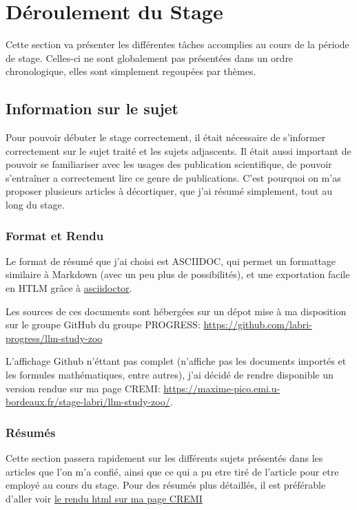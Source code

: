 \chapter{Déroulement du Stage}
\label{main}

Cette section va présenter les différentes tâches accomplies au cours de la période de stage.
Celles-ci ne sont globalement pas présentées dans un ordre chronologique, elles sont simplement regoupées par thèmes.


\section{Information sur le sujet}

Pour pouvoir débuter le stage correctement, il était nécessaire de s'informer correctement sur le sujet traité et les sujets adjascents.
Il était aussi important de pouvoir se familiariser avec les usages des publication scientifique, de pouvoir s'entraîner a correctement
lire ce genre de publications.
C'est pourquoi on m'as proposer plusieurs articles à décortiquer, que j'ai résumé simplement, tout au long du stage.

\subsection{Format et Rendu}

Le format de résumé que j'ai choisi est ASCIIDOC, qui permet un formattage similaire à Markdown (avec un peu plus de possibilités), et une exportation facile en HTLM grâce à \href{https://asciidoctor.org/}{asciidoctor}.

Les sources de ces documents sont hébergées sur un dépot mise à ma disposition sur le groupe GitHub du groupe PROGRESS:
\url{https://github.com/labri-progress/llm-study-zoo}

L'affichage Github n'éttant pas complet (n'affiche pas les documents importés et les formules mathématiques, entre autres), j'ai décidé de rendre disponible un version rendue sur ma page CREMI:
\url{https://maxime-pico.emi.u-bordeaux.fr/stage-labri/llm-study-zoo/}.


\subsection{Résumés}

Cette section passera rapidement sur les différents sujets présentés dans les articles que l'on m'a confié, ainsi que ce qui a pu etre tiré de l'article pour etre employé au cours du stage.
Pour des résumés plus détaillés, il est préférable d'aller voir \href{https://maxime-pico.emi.u-bordeaux.fr/stage-labri/llm-study-zoo/}{le rendu html sur ma page CREMI}


